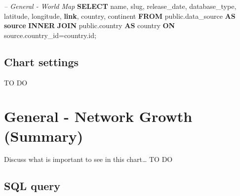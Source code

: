 \documentclass[]{book}
\newenvironment{Shaded}{\begin{snugshade}}{\end{snugshade}}
\newcommand{\KeywordTok}[1]{\textcolor[rgb]{0.13,0.29,0.53}{\textbf{#1}}}
\newcommand{\CommentTok}[1]{\textcolor[rgb]{0.56,0.35,0.01}{\textit{#1}}}
\newcommand{\NormalTok}[1]{#1}
\begin{document}
\begin{Shaded}
\begin{Highlighting}[]
\CommentTok{--    General - World Map}
\KeywordTok{SELECT}\NormalTok{  name,}
\NormalTok{        slug,}
\NormalTok{        release_date,}
\NormalTok{        database_type,}
\NormalTok{        latitude,}
\NormalTok{        longitude,}
        \KeywordTok{link}\NormalTok{,}
\NormalTok{        country,}
\NormalTok{        continent}
\KeywordTok{FROM}\NormalTok{ public.data_source }\KeywordTok{AS} \KeywordTok{source} \KeywordTok{INNER} \KeywordTok{JOIN}\NormalTok{ public.country }
  \KeywordTok{AS}\NormalTok{ country }\KeywordTok{ON}\NormalTok{ source.country_id=country.id;}
\end{Highlighting}
\end{Shaded}

\subsection{Chart settings}\label{chart-settings-2}

TO DO

\section{General - Network Growth
(Summary)}\label{general---network-growth-summary}

Discuss what is important to see in this chart\ldots{} TO DO

\subsection{SQL query}\label{sql-query-3}
\end{document}
